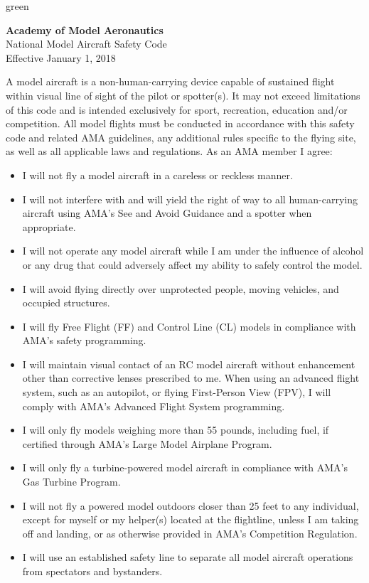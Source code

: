 \documentclass[
]{book}
\providecommand{\tightlist}{%
  \setlength{\itemsep}{0pt}\setlength{\parskip}{0pt}}
\begin{document}
\begin{content-box}{green}

\textbf{Academy of Model Aeronautics}\\
National Model Aircraft Safety Code\\
Effective January 1, 2018

A model aircraft is a non-human-carrying device capable of sustained flight within visual line of sight of the pilot or spotter(s). It may not exceed limitations of this code and is intended exclusively for sport, recreation, education and/or competition. All model flights must be conducted in accordance with this safety code and related AMA guidelines, any additional rules specific to the flying site, as well as all applicable laws and regulations.
As an AMA member I agree:

\begin{itemize}
\tightlist
\item
  I will not fly a model aircraft in a careless or reckless manner.
\item
  I will not interfere with and will yield the right of way to all human-carrying aircraft using AMA's See and Avoid Guidance and a spotter when appropriate.
\item
  I will not operate any model aircraft while I am under the influence of alcohol or any drug that could adversely affect my ability to safely control the model.
\item
  I will avoid flying directly over unprotected people, moving vehicles, and occupied structures.
\item
  I will fly Free Flight (FF) and Control Line (CL) models in compliance with AMA's safety programming.
\item
  I will maintain visual contact of an RC model aircraft without enhancement other than corrective lenses prescribed to me. When using an advanced flight system, such as an autopilot, or flying First-Person View (FPV), I will comply with AMA's Advanced Flight System programming.
\item
  I will only fly models weighing more than 55 pounds, including fuel, if certified through AMA's Large Model Airplane Program.
\item
  I will only fly a turbine-powered model aircraft in compliance with AMA's Gas Turbine Program.
\item
  I will not fly a powered model outdoors closer than 25 feet to any individual, except for myself or my helper(s) located at the flightline, unless I am taking off and landing, or as otherwise provided in AMA's Competition Regulation.
\item
  I will use an established safety line to separate all model aircraft operations from spectators and bystanders.
\end{itemize}

\end{content-box}
\end{document}
